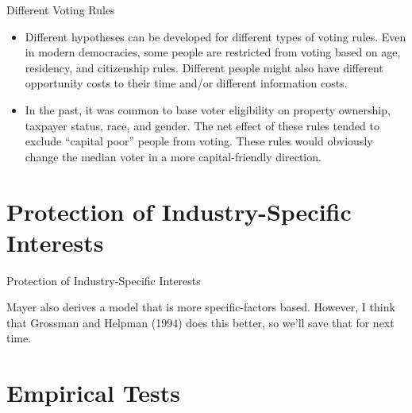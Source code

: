 \documentclass[aspectratio=169]{beamer}
\begin{document}

\begin{frame}{Different Voting Rules}

\begin{itemize}
    \item<1-> Different hypotheses can be developed for different types of voting rules.  Even in modern democracies, some people are restricted from voting based on age, residency, and citizenship rules.  Different people might also have different opportunity costs to their time and/or different information costs.
    \item<2-> In the past, it was common to base voter eligibility on property ownership, taxpayer status, race, and gender.  The net effect of these rules tended to exclude ``capital poor” people from voting.  These rules would obviously change the median voter in a more capital-friendly direction.
\end{itemize}
    
\end{frame}


\section{Protection of Industry-Specific Interests}


\begin{frame}{Protection of Industry-Specific Interests}

Mayer also derives a model that is more specific-factors based.  However, I think that Grossman and Helpman (1994) does this better, so we’ll save that for next time.
    
\end{frame}


\section{Empirical Tests}

\end{document}
